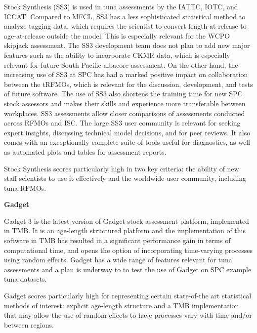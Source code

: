 \documentclass{SCreport}
\begin{document}
Stock Synthesis (SS3) is used in tuna assessments by the IATTC, IOTC, and ICCAT.
Compared to MFCL, SS3 has a less sophisticated statistical method to analyze
tagging data, which requires the scientist to convert length-at-release to
age-at-release outside the model. This is especially relevant for the WCPO
skipjack assessment. The SS3 development team does not plan to add new major
features such as the ability to incorporate CKMR data, which is especially
relevant for future South Pacific albacore assessment. On the other hand, the
increasing use of SS3 at SPC has had a marked positive impact on collaboration
between the tRFMOs, which is relevant for the discussion, development, and tests
of future software. The use of SS3 also shortens the training time for new SPC
stock assessors and makes their skills and experience more transferable between
workplaces. SS3 assessments allow closer comparisons of assessments conducted
across RFMOs and ISC. The large SS3 user community is relevant for seeking
expert insights, discussing technical model decisions, and for peer reviews. It
also comes with an exceptionally complete suite of tools useful for diagnostics,
as well as automated plots and tables for assessment reports.

Stock Synthesis scores particularly high in two key criteria: the ability of new
staff scientists to use it effectively and the worldwide user community,
including tuna RFMOs.

\vspace{1ex}

\textbf{Gadget}

\vspace{-1ex}

Gadget 3 is the latest version of Gadget stock assessment platform, implemented
in TMB. It is an age-length structured platform and the implementation of this
software in TMB has resulted in a significant performance gain in terms of
computational time, and opens the option of incorporating time-varying processes
using random effects. Gadget has a wide range of features relevant for tuna
assessments and a plan is underway to to test the use of Gadget on SPC example
tuna datasets.

Gadget scores particularly high for representing certain state-of-the art
statistical methods of interest: explicit age-length structure and a TMB
implementation that may allow the use of random effects to have processes vary
with time and/or between regions.

\vspace{1ex}
\end{document}
